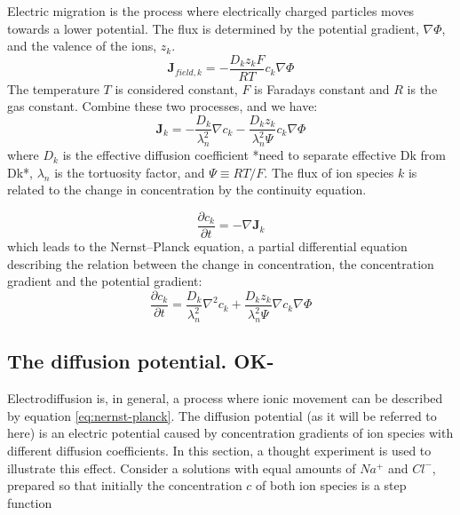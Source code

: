 \documentclass{article}
\begin{document}
Electric migration is the process where electrically charged particles moves towards a lower potential. The flux is determined by the potential gradient, $\nabla \Phi$,  and the valence of the ions, $z_k$. 
\begin{equation}\label{eq:field}
\bm{J}_{field,k} = -\frac{D_kz_kF}{RT} c_k\nabla \Phi
\end{equation}
The temperature $T$ is considered constant, $F$ is Faradays constant and $R$ is the gas constant. Combine these two processes, and we have:
 \begin{equation}\label{eq:eldiff flux}
\bm{J}_k = -\frac{D_k}{\lambda_n^2}\nabla c_k -\frac{D_k z_k}{\lambda_n^2 \Psi}c_k  \nabla \Phi
\end{equation}
where $D_k$ is the effective diffusion coefficient *need to separate effective Dk from Dk*, $\lambda_n$ is the tortuosity factor, and $\Psi \equiv RT/F$.
The flux  of ion species $k$ is related to the change in concentration by the continuity equation. 

\begin{equation}\label{eq:continuity}
\frac{\partial c_k}{\partial t} = -\nabla \bm{J}_k
\end{equation}
which leads to the Nernst--Planck equation, a partial differential equation describing the relation between the change in concentration, the concentration gradient and the potential gradient:
 \begin{equation}\label{eq:nernst-planck}
\frac{\partial c_k}{\partial t}  = \frac{D_k}{\lambda_n^2}\nabla^2 c_k +\frac{D_k z_k}{\lambda_n^2 \Psi}\nabla c_k  \nabla \Phi
\end{equation}


\subsection{The diffusion potential. OK-}
Electrodiffusion is, in general, a process where ionic movement can be described by equation \ref{eq:nernst-planck}. The diffusion potential (as it will be referred to here) is an electric potential caused by concentration gradients of ion species with different diffusion coefficients. In this section, a thought experiment is used to illustrate this effect.
Consider a solutions with equal amounts of $Na^+$ and $Cl^-$, prepared so that initially the concentration $c$ of both ion species is a step function 
\end{document}
